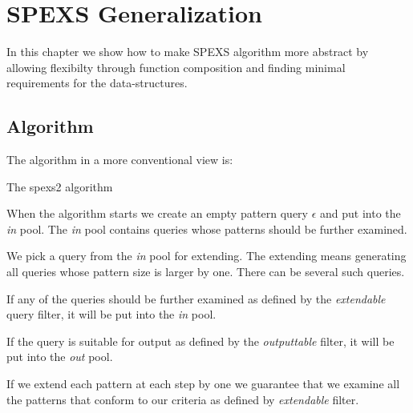 \chapter{SPEXS Generalization}

In this chapter we show how to make SPEXS algorithm more abstract by allowing flexibilty through function composition and finding minimal requirements for the data-structures.

\section{Algorithm}

The algorithm in a more conventional view is:

\begin{algorithm}[H]
	\caption{The spexs2 algorithm}
\begin{algorithmic}[1]
			\EndIf
			\EndIf
		\EndFor
	\EndWhile
\end{algorithmic}
\end{algorithm}

When the algorithm starts we create an empty pattern query $\epsilon$ and put into the \emph{in} pool. The \emph{in} pool contains queries whose patterns should be further examined.

We pick a query from the \emph{in} pool for extending. The extending means generating all queries whose pattern size is larger by one. There can be several such queries.

If any of the queries should be further examined as defined by the \emph{extendable} query filter, it will be put into the \emph{in} pool.

If the query is suitable for output as defined by the \emph{outputtable} filter, it will be put into the \emph{out} pool. 

If we extend each pattern at each step by one we guarantee that we examine all the patterns that conform to our criteria as defined by \emph{extendable} filter.

